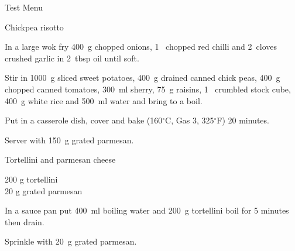 \begin{menu}{Test Menu}
\begin{recipe}{2}{Chickpea risotto}
    \begin{instructions}
    \item 
        In a large wok fry
        400~g chopped onions,
        1~ chopped red chilli
        and
        2~cloves crushed garlic
        in
        2~tbsp  oil
        until soft.
      \item 
        Stir in
        1000~g sliced sweet potatoes,
        400~g drained canned chick peas,
        400~g chopped canned tomatoes,
        300~ml  sherry,
        75~g  raisins,
        1~ crumbled stock cube,
        400~g  white rice
        and
        500~ml  water
        and bring to a boil.
      \item 
        Put in a
        casserole dish,
        cover and bake 
      (160$^{\circ}$C, Gas 3, 325$^{\circ}$F)
     20 minutes.
      \item 
      Server with 
      150~g grated parmesan.
    
    \end{instructions}
    \end{recipe}%
  
    \begin{recipe}{1}{Tortellini and parmesan cheese}%
    
		\begin{ingredients}
		200 g tortellini  \\
	20 g grated parmesan  \\
	
		\end{ingredients}
	
    \begin{instructions}
    \item 
      In a
      sauce pan
      put
      400~ml  boiling water
      and
      200~g  tortellini
      boil for 5 minutes then drain.
    \item 
        Sprinkle with
        20~g  grated parmesan.
      
    \end{instructions}
    \end{recipe}%
  
    \clearpage
    \end{menu}
	
